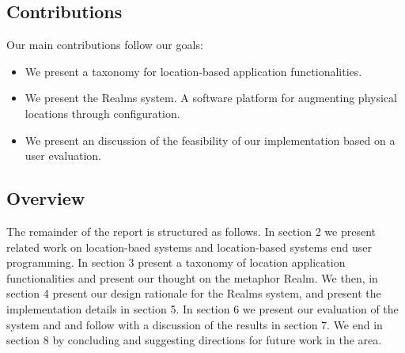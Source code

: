 \subsection{Contributions} %
\label{sub:contributions}
Our main contributions follow our goals:
\begin{itemize}
	\item We present a taxonomy for location-based application functionalities. 
	\item We present the Realms system. A software platform for augmenting physical locations through configuration.
	\item We present an discussion of the feasibility of our implementation based on a user evaluation.
\end{itemize}

\subsection{Overview} %
\label{sub:overview}
The remainder of the report is structured as follows. In section 2 we present related work on location-baed systems and location-based systems end user programming. In section 3 present a taxonomy of location application functionalities and present our thought on the metaphor Realm. We then, in section 4 present our design rationale for the Realms system, and present the implementation details in section 5. In section 6 we present our evaluation of the system and and follow with a discussion of the results in section 7. We end in section 8 by concluding and suggesting directions for future work in the area.
